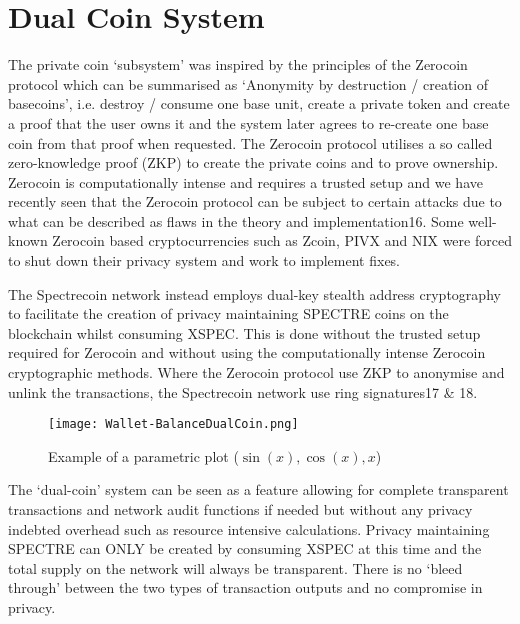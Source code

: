 \section{Dual Coin System}
The private coin ‘subsystem’ was inspired by the principles of the Zerocoin protocol which can be summarised as ‘Anonymity by destruction / creation of basecoins’, i.e. destroy / consume one base unit, create a private token and create a proof that the user owns it and the system later agrees to re-create one base coin from that proof when requested. The Zerocoin protocol utilises a so called zero-knowledge proof (ZKP) to create the private coins and to prove ownership. Zerocoin is computationally intense and requires a trusted setup and we have recently seen that the Zerocoin protocol can be subject to certain attacks due to what can be described as flaws in the theory and implementation16. Some well-known Zerocoin based cryptocurrencies such as Zcoin, PIVX and NIX were forced to shut down their privacy system and work to implement fixes. 

 

The Spectrecoin network instead employs dual-key stealth address cryptography to facilitate the creation of privacy maintaining SPECTRE coins on the blockchain whilst consuming XSPEC. This is done without the trusted setup required for Zerocoin and without using the computationally intense Zerocoin cryptographic methods. Where the Zerocoin protocol use ZKP to anonymise and unlink the transactions, the Spectrecoin network use ring signatures17 \& 18. 



\begin{figure}[h]
	\caption{Example of a parametric plot ($\sin (x), \cos(x), x$)}
	\centering
	\texttt{[image: Wallet-BalanceDualCoin.png]} 
\end{figure}

 

The ‘dual-coin’ system can be seen as a feature allowing for complete transparent transactions and network audit functions if needed but without any privacy indebted overhead such as resource intensive calculations. Privacy maintaining SPECTRE can ONLY be created by consuming XSPEC at this time and the total supply on the network will always be transparent. There is no ‘bleed through’ between the two types of transaction outputs and no compromise in privacy.